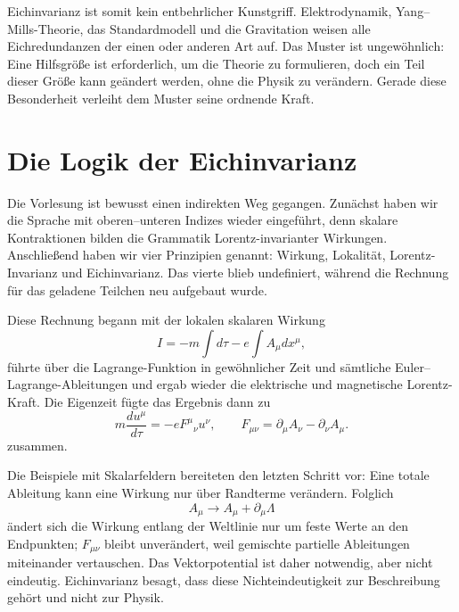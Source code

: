 Eichinvarianz ist somit kein entbehrlicher Kunstgriff. Elektrodynamik, Yang--Mills-Theorie, das Standardmodell und die Gravitation weisen alle Eichredundanzen der einen oder anderen Art auf. Das Muster ist ungewöhnlich: Eine Hilfsgröße ist erforderlich, um die Theorie zu formulieren, doch ein Teil dieser Größe kann geändert werden, ohne die Physik zu verändern. Gerade diese Besonderheit verleiht dem Muster seine ordnende Kraft.

\section{Die Logik der Eichinvarianz}

Die Vorlesung ist bewusst einen indirekten Weg gegangen. Zunächst haben wir die Sprache mit oberen--unteren Indizes wieder eingeführt, denn skalare Kontraktionen bilden die Grammatik Lorentz-invarianter Wirkungen. Anschließend haben wir vier Prinzipien genannt: Wirkung, Lokalität, Lorentz-Invarianz und Eichinvarianz. Das vierte blieb undefiniert, während die Rechnung für das geladene Teilchen neu aufgebaut wurde.

Diese Rechnung begann mit der lokalen skalaren Wirkung
\begin{equation}
I
=
-m\int d\tau
-e\int A_\mu dx^\mu,
\end{equation}
führte über die Lagrange-Funktion in gewöhnlicher Zeit und sämtliche Euler--Lagrange-Ableitungen und ergab wieder die elektrische und magnetische Lorentz-Kraft. Die Eigenzeit fügte das Ergebnis dann zu
\begin{equation}
m\frac{du^\mu}{d\tau}
=
-eF^\mu{}_\nu u^\nu,
\qquad
F_{\mu\nu}
=
\partial_\mu A_\nu-\partial_\nu A_\mu.
\end{equation}zusammen.

Die Beispiele mit Skalarfeldern bereiteten den letzten Schritt vor: Eine totale Ableitung kann eine Wirkung nur über Randterme verändern. Folglich
\begin{equation}
A_\mu\longrightarrow A_\mu+\partial_\mu\Lambda
\end{equation}
ändert sich die Wirkung entlang der Weltlinie nur um feste Werte an den Endpunkten; \(F_{\mu\nu}\) bleibt unverändert, weil gemischte partielle Ableitungen miteinander vertauschen. Das Vektorpotential ist daher notwendig, aber nicht eindeutig. Eichinvarianz besagt, dass diese Nichteindeutigkeit zur Beschreibung gehört und nicht zur Physik.
